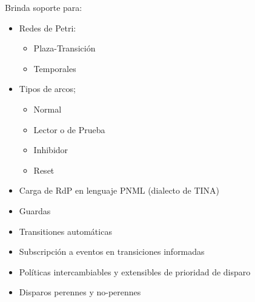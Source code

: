 Brinda soporte para:
\begin{itemize}
  \item Redes de Petri:
  \begin{itemize}
    \item Plaza-Transición
    \item Temporales
  \end{itemize}
  
  \item Tipos de arcos;
  \begin{itemize}
    \item Normal
    \item Lector o de Prueba
    \item Inhibidor
    \item Reset
  \end{itemize}
  
  \item Carga de RdP en lenguaje PNML (dialecto de TINA)
  \item Guardas
  \item Transitiones automáticas
  \item Subscripción a eventos en transiciones informadas
  \item Políticas intercambiables y extensibles de prioridad de disparo
  \item Disparos perennes y no-perennes

\end{itemize}
